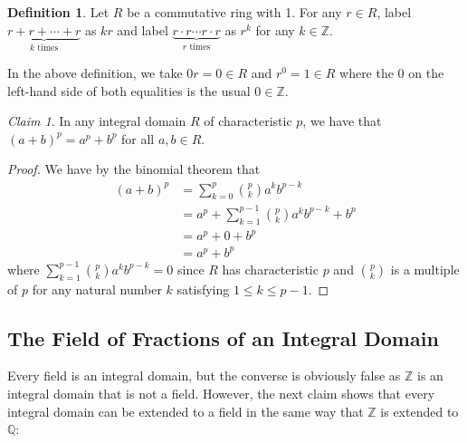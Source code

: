 \documentclass[12pt,letterpaper,DIV=11,final]{scrartcl}
\theoremstyle{plain}
\theoremstyle{definition}
\newtheorem{definition}{Definition}[section]
\theoremstyle{remark}
\newtheorem{claim}{Claim}
\begin{document}
\begin{definition}
  Let $R$ be a commutative ring with 1.
  For any $r \in R$, label $\underbrace{r + r + \cdots + r}_\text{$k$ times}$ as $kr$ and label $\underbrace{r \cdot r \cdots r \cdot r}_\text{$r$ times}$ as $r^k$ for any $k \in \mathbb{Z}$.
\end{definition}

In the above definition, we take $0r = 0 \in R$ and $r^0 = 1 \in R$ where the 0 on the left-hand side of both equalities is the usual $0 \in \mathbb{Z}$.

\begin{claim}
  In any integral domain $R$ of characteristic $p$, we have that ${(a + b)}^p = a^p + b^p$ for all $a, b \in R$.

  \begin{proof}
    We have by the binomial theorem that
    \begin{align*}
      {(a + b)}^p &= \sum_{k = 0}^p \binom{p}{k} a^k b^{p - k} \\
                  &= a^p + \sum_{k = 1}^{p - 1} \binom{p}{k} a^k b^{p - k} + b^p \\
                  &= a^p + 0 + b^p \\
                  &= a^p + b^p
    \end{align*}
    where $\sum_{k = 1}^{p - 1} \binom{p}{k} a^k b^{p - k} = 0$ since $R$ has characteristic $p$ and $\binom{p}{k}$ is a multiple of $p$ for any natural number $k$ satisfying $1 \leq k \leq p - 1$.
  \end{proof}
\end{claim}

\subsection{The Field of Fractions of an Integral Domain}

Every field is an integral domain, but the converse is obviously false as $\mathbb{Z}$ is an integral domain that is not a field.
However, the next claim shows that every integral domain can be extended to a field in the same way that $\mathbb{Z}$ is extended to $\mathbb{Q}$:
\end{document}
